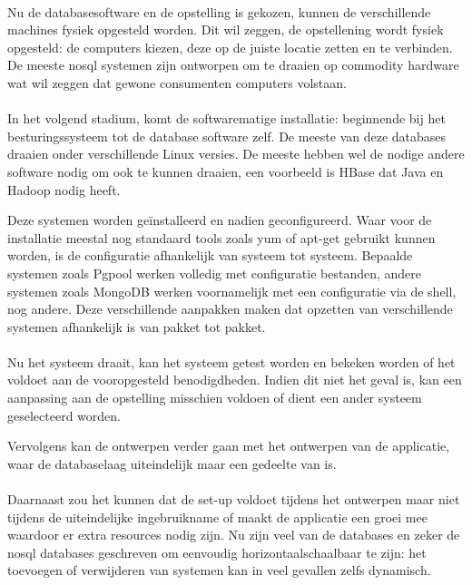 \paragraph{} Nu de databasesoftware en de opstelling is gekozen, kunnen de verschillende machines fysiek opgesteld worden. Dit wil zeggen, de opstellening wordt fysiek opgesteld: de computers kiezen, deze op de juiste locatie zetten en te verbinden. De meeste \gls{nosql} systemen zijn ontworpen om te draaien op commodity hardware wat wil zeggen dat gewone consumenten computers volstaan. 

\paragraph{} In het volgend stadium, komt de softwarematige installatie: beginnende bij het besturingssysteem tot de database software zelf. De meeste van deze databases draaien onder verschillende Linux versies. De meeste hebben wel de nodige andere software nodig om ook te kunnen draaien, een voorbeeld is HBase dat Java en Hadoop nodig heeft. 

Deze systemen worden geïnstalleerd en nadien geconfigureerd. Waar voor de installatie meestal nog standaard tools zoals \gls{yum} of \gls{apt-get} gebruikt kunnen worden, is de configuratie afhankelijk van systeem tot systeem. Bepaalde systemen zoals Pgpool werken volledig met configuratie bestanden, andere systemen zoals MongoDB werken voornamelijk met een configuratie via de shell, nog andere. Deze verschillende aanpakken maken dat opzetten van verschillende systemen afhankelijk is van pakket tot pakket.

\paragraph{} Nu het systeem draait, kan het systeem getest worden en bekeken worden of het voldoet aan de vooropgesteld benodigdheden. Indien dit niet het geval is, kan een aanpassing aan de opstelling misschien voldoen of dient een ander systeem geselecteerd worden. 

Vervolgens kan de ontwerpen verder gaan met het ontwerpen van de applicatie, waar de databaselaag uiteindelijk maar een gedeelte van is. 

\paragraph{}Daarnaast zou het kunnen dat de set-up voldoet tijdens het ontwerpen maar niet tijdens de uiteindelijke ingebruikname of maakt de applicatie een groei mee waardoor er extra resources nodig zijn. Nu zijn veel van de databases en zeker de \gls{nosql} databases geschreven om eenvoudig \gls{horizontaalschaalbaar} te zijn: het toevoegen of verwijderen van systemen kan in veel gevallen zelfs dynamisch. 

